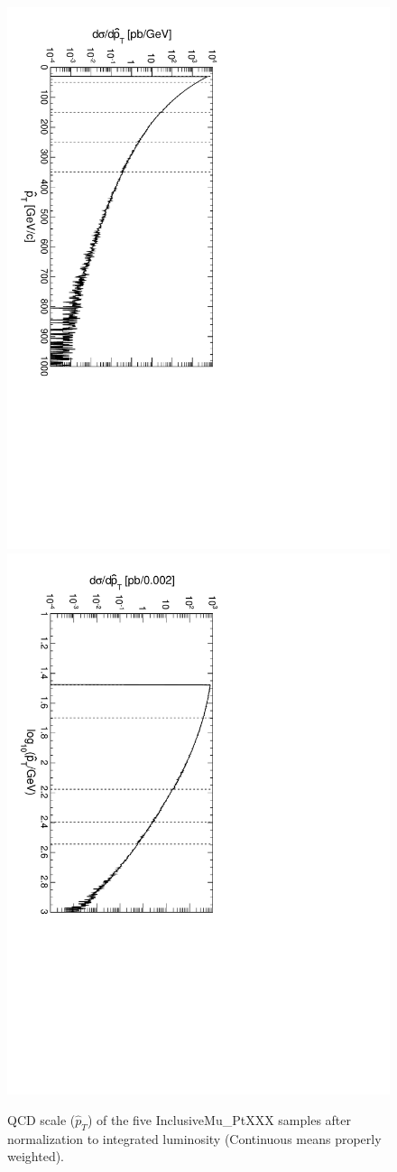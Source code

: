 \documentclass[12pt]{article}
\begin{document}
\begin{figure}
\includegraphics[height=0.5\linewidth, angle=90]{fig/backgroundsMatching_plot/qscale.pdf}
\includegraphics[height=0.5\linewidth, angle=90]{fig/backgroundsMatching_plot/log10qscale.pdf}

\caption{QCD scale ($\hat{p}_T$) of the five InclusiveMu\_PtXXX samples after normalization to integrated luminosity (Continuous means properly weighted). \label{fig:qscale}}
\end{figure}
\end{document}
